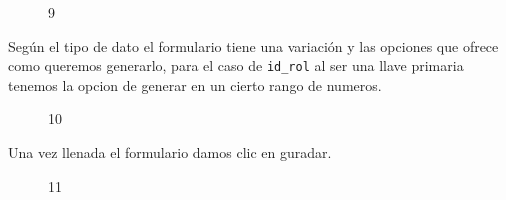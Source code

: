\begin{figure}[H]
\caption{9}
\centering
{}
\end{figure}
Seg\'un el tipo de dato el formulario tiene una variaci\'on y las opciones que ofrece como queremos generarlo,
para el caso de \texttt{id\_rol} al ser una llave primaria tenemos la opcion de generar en un cierto rango de numeros.
\begin{figure}[H]
\caption{10}
\centering
{}
\end{figure}
Una vez llenada el formulario damos clic en guradar.
\begin{figure}[H]
\caption{11}
\centering
{}
\end{figure}
